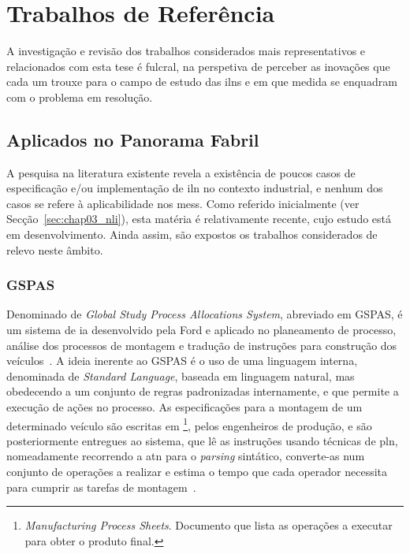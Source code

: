 \section{Trabalhos de Referência}
\label{sec:chap03_mainmarketstudy}
A investigação e revisão dos trabalhos considerados mais representativos e relacionados com esta tese é fulcral, na perspetiva de perceber as inovações que cada um trouxe para o campo de estudo das \glspl{iln} e em que medida se enquadram com o problema em resolução.

\subsection{Aplicados no Panorama Fabril}
A pesquisa na literatura existente revela a existência de poucos casos de especificação e/ou implementação de \gls{iln} no contexto industrial, e nenhum dos casos se refere à aplicabilidade nos \glspl{mes}. Como referido inicialmente (ver Secção~\ref{sec:chap03_nli}), esta matéria é relativamente recente, cujo estudo está em desenvolvimento. Ainda assim, são expostos os trabalhos considerados de relevo neste âmbito.

\subsubsection*{GSPAS}
Denominado de \textit{Global Study Process Allocations System}, abreviado em GSPAS, é um sistema de \gls{ia} desenvolvido pela Ford e aplicado no planeamento de processo, análise dos processos de montagem e tradução de instruções para construção dos veículos~\parencite{intelligent_systems_manufacturing_ford}. A ideia inerente ao GSPAS é o uso de uma linguagem interna, denominada de \textit{Standard Language}, baseada em linguagem natural, mas obedecendo a um conjunto de regras padronizadas internamente, e que permite a execução de ações no processo. As especificações para a montagem de um determinado veículo são escritas em \footnote{\textit{Manufacturing Process Sheets}. Documento que lista as operações a executar para obter o produto final.}, pelos engenheiros de produção, e são posteriormente entregues ao sistema, que lê as instruções usando técnicas de \gls{pln}, nomeadamente recorrendo a \gls{atn} para o \textit{parsing} sintático, converte-as num conjunto de operações a realizar e estima o tempo que cada operador necessita para cumprir as tarefas de montagem~\parencite{intelligent_systems_manufacturing_ford, machine_translation_global_enterprise_ford}.

